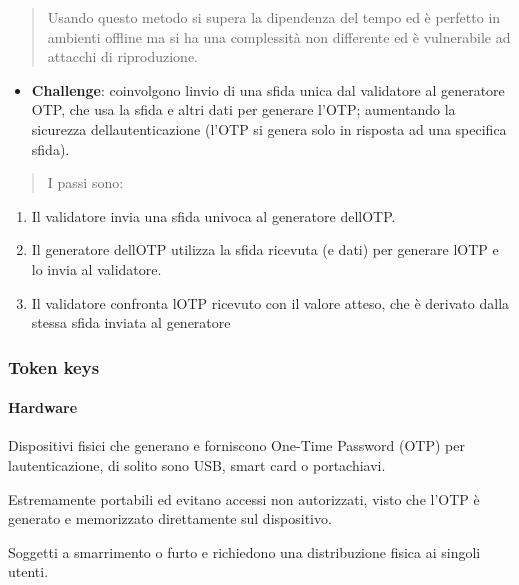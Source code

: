 \begin{quote}
Usando questo metodo si supera la dipendenza del tempo ed è perfetto in
ambienti offline ma si ha una complessità non differente ed è
vulnerabile ad attacchi di riproduzione.
\end{quote}

\begin{itemize}
\item
  \textbf{Challenge}: coinvolgono l\textquotesingle invio di una sfida
  unica dal validatore al generatore OTP, che usa la sfida e altri dati
  per generare l'OTP; aumentando la sicurezza
  dell\textquotesingle autenticazione (l'OTP si genera solo in risposta
  ad una specifica sfida).
\end{itemize}

\begin{quote}
I passi sono:
\end{quote}

\begin{enumerate}
\def\labelenumi{\arabic{enumi}.}
\item
  Il validatore invia una sfida univoca al generatore
  dell\textquotesingle OTP.
\item
  Il generatore dell\textquotesingle OTP utilizza la sfida ricevuta (e
  dati) per generare l\textquotesingle OTP e lo invia al validatore.
\item
  Il validatore confronta l\textquotesingle OTP ricevuto con il valore
  atteso, che è derivato dalla stessa sfida inviata al generatore
\end{enumerate}

\subsubsection{Token keys}\label{token-keys}

\paragraph{Hardware}\label{hardware}

Dispositivi fisici che generano e forniscono One-Time Password (OTP) per
l\textquotesingle autenticazione, di solito sono USB, smart card o
portachiavi.

Estremamente portabili ed evitano accessi non autorizzati, visto che
l'OTP è generato e memorizzato direttamente sul dispositivo.

Soggetti a smarrimento o furto e richiedono una distribuzione fisica ai
singoli utenti.

